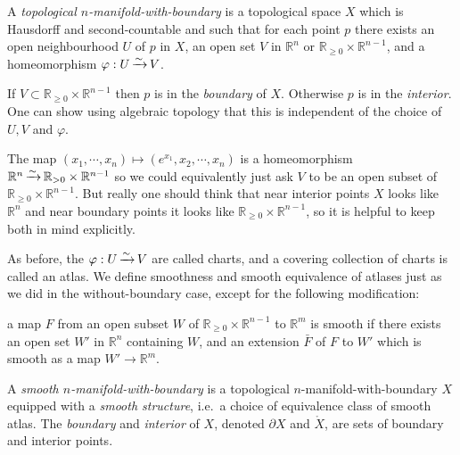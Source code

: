 \documentclass[a4paper,11pt]{article}
\begin{document}
	\begin{defi}
		A \emph{topological $n$-manifold-with-boundary} is a topological space $X$ which is Hausdorff and second-countable and such that for each point $p$ there exists an open neighbourhood $U$ of $p$ in $X$, an open set $V$ in $\mathbb{R}^n$ or $\mathbb{R}_{\geq 0}\times \mathbb{R}^{n-1}$, and a homeomorphism $\varphi : U \operatorname{\xrightarrow{\sim}} V$.

		If $V \subset \mathbb{R}_{\geq 0}\times \mathbb{R}^{n-1}$ then $p$ is in the \emph{boundary} of $X$. Otherwise $p$ is in the \emph{interior}. One can show using algebraic topology that this is independent of the choice of $U,V$ and $\varphi$. 
	\end{defi}

	\begin{rmk}
		The map $(x_1, \cdots, x_n)\mapsto (e ^{x_1}, x_2, \cdots, x_n)$ is a homeomorphism\\ $\mathbb{R}^n \operatorname{\xrightarrow{\sim}} \mathbb{R}_{>0}\times \mathbb{R}^{n-1}$ so we could equivalently just ask $V$ to be an open subset of $\mathbb{R}_{\geq 0}\times \mathbb{R}^{n-1}$. But really one should think that near interior points $X$ looks like $\mathbb{R}^n$ and near boundary points it looks like $\mathbb{R}_{\geq 0}\times \mathbb{R}^{n-1}$, so it is helpful to keep both in mind explicitly.
	\end{rmk}

	As before, the $\varphi: U \operatorname{\xrightarrow{\sim}} V$ are called charts, and a covering collection of charts is called an atlas. We define smoothness and smooth equivalence of atlases just as we did in the without-boundary case, except for the following modification:

	\begin{center}
		\begin{minipage}[t]{0.9\textwidth}
			a map $F$ from an open subset $W$ of $\mathbb{R}_{\geq 0}\times \mathbb{R}^{n-1}$ to $\mathbb{R}^m$ is smooth if there exists an open set $W'$ in $\mathbb{R}^n$ containing $W$, and an extension $\bar{F}$ of $F$ to $W'$ which is smooth as a map $W' \to \mathbb{R}^m$.
		\end{minipage}
	\end{center}

	\begin{defi}
		A \emph{smooth $n$-manifold-with-boundary} is a topological $n$-manifold-with-boundary $X$ equipped with a \emph{smooth structure}, i.e.\ a choice of equivalence class of smooth atlas. The \emph{boundary} and \emph{interior} of $X$, denoted $\partial X$ and $\mathring{X}$, are sets of boundary and interior points.
	\end{defi}
\end{document}
